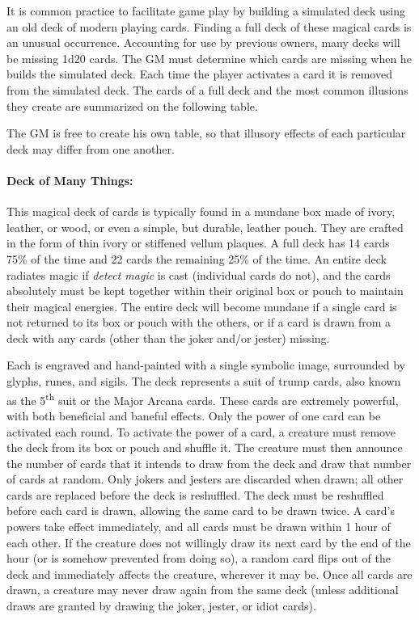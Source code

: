 \begin{multicols}{2}

It is common practice to facilitate game play by building a simulated deck using an old deck of modern playing cards.  Finding a full deck of these magical cards is an unusual occurrence.  Accounting for use by previous owners, many decks will be missing 1d20 cards.  The GM must determine which cards are missing when he builds the simulated deck.  Each time the player activates a card it is removed from the simulated deck.  The cards of a full deck and the most common illusions they create are summarized on the following table.

The GM is free to create his own table, so that illusory effects of each particular deck may differ from one another.    

\paragraph{Deck of Many Things:} This magical deck of cards is typically found in a mundane box made of ivory, leather, or wood, or even a simple, but durable, leather pouch.  They are crafted in the form of thin ivory or stiffened vellum plaques.  A full deck has 14 cards 75\% of the time and 22 cards the remaining 25\% of the time.  An entire deck radiates magic if \textit{detect magic} is cast (individual cards do not), and the cards absolutely must be kept together within their original box or pouch to maintain their magical energies. The entire deck will become mundane if a single card is not returned to its box or pouch with the others, or if a card is drawn from a deck with any cards (other than the joker and/or jester) missing.  

Each is engraved and hand-painted with a single symbolic image, surrounded by glyphs, runes, and sigils.  The deck represents a suit of trump cards, also known as the 5\textsuperscript{th} suit or the Major Arcana cards.  These cards are extremely powerful, with both beneficial and baneful effects.  Only the power of one card can be activated each round.  To activate the power of a card, a creature must remove the deck from its box or pouch and shuffle it.  The creature must then announce the number of cards that it intends to draw from the deck and draw that number of cards at random. Only jokers and jesters are discarded when drawn; all other cards are replaced before the deck is reshuffled.  The deck must be reshuffled before each card is drawn, allowing the same card to be drawn twice.  A card's powers take effect immediately, and all cards must be drawn within 1 hour of each other.  If the creature does not willingly draw its next card by the end of the hour (or is somehow prevented from doing so), a random card flips out of the deck and immediately affects the creature, wherever it may be. Once all cards are drawn, a creature may never draw again from the same deck (unless additional draws are granted by drawing the joker, jester, or idiot cards).


\end{multicols}
